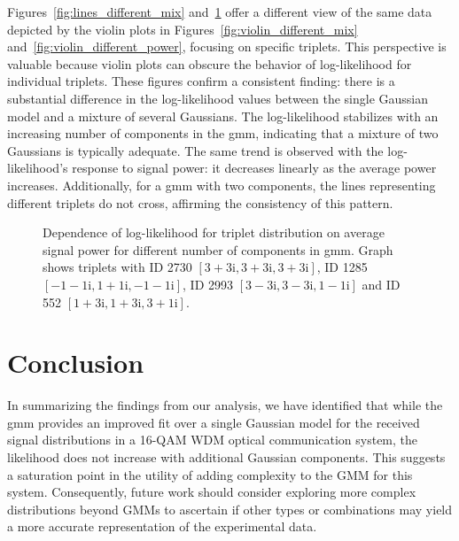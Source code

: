 Figures~\ref{fig:lines_different_mix} and~\ref{fig:loglik_for_triplets} offer a different view of the same data depicted by the violin plots in Figures~\ref{fig:violin_different_mix} and~\ref{fig:violin_different_power}, focusing on specific triplets. This perspective is valuable because violin plots can obscure the behavior of log-likelihood for individual triplets. These figures confirm a consistent finding: there is a substantial difference in the log-likelihood values between the single Gaussian model and a mixture of several Gaussians. The log-likelihood stabilizes with an increasing number of components in the \gls{gmm}, indicating that a mixture of two Gaussians is typically adequate. The same trend is observed with the log-likelihood's response to signal power: it decreases linearly as the average power increases. Additionally, for a \gls{gmm} with two components, the lines representing different triplets do not cross, affirming the consistency of this pattern.


\begin{figure}[htpb]
    \caption{Dependence of log-likelihood for triplet distribution on average signal power for different number of components in \gls{gmm}. Graph shows triplets with ID 2730 $[3+3\mathrm{i}, 3+3\mathrm{i}, 3+3\mathrm{i}]$, ID 1285 $[-1-1\mathrm{i}, 1+1\mathrm{i}, -1-1\mathrm{i}]$, ID 2993 $[3-3\mathrm{i}, 3-3\mathrm{i}, 1-1\mathrm{i}]$ and ID 552 $[1+3\mathrm{i}, 1+3\mathrm{i}, 3+1\mathrm{i}]$.}
    \label{fig:loglik_for_triplets}
\end{figure}

\section{Conclusion}
In summarizing the findings from our analysis, we have identified that while the \Gls{gmm} provides an improved fit over a single Gaussian model for the received signal distributions in a 16-QAM WDM optical communication system, the likelihood does not increase with additional Gaussian components. This suggests a saturation point in the utility of adding complexity to the GMM for this system. Consequently, future work should consider exploring more complex distributions beyond GMMs to ascertain if other types or combinations may yield a more accurate representation of the experimental data.

